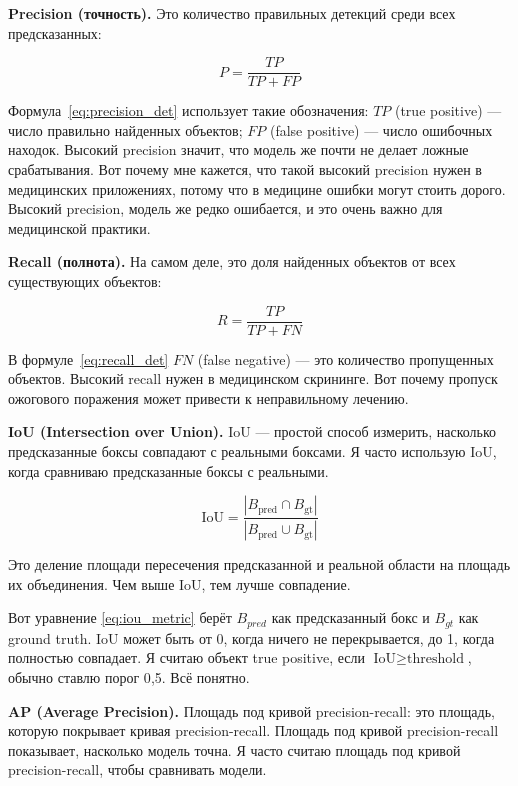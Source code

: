 \textbf{Precision (точность).} Это количество правильных детекций среди всех предсказанных:

\begin{equation}
P = \frac{TP}{TP + FP}
\label{eq:precision_det}
\end{equation}

Формула~\eqref{eq:precision_det} использует такие обозначения: $TP$ (true positive) --- число правильно найденных объектов; $FP$ (false positive) --- число ошибочных находок. Высокий precision значит, что модель же почти не делает ложные срабатывания. Вот почему мне кажется, что такой высокий precision нужен в медицинских приложениях, потому что в медицине ошибки могут стоить дорого. Высокий precision, модель же редко ошибается, и это очень важно для медицинской практики.

\textbf{Recall (полнота).} На самом деле, это доля найденных объектов от всех существующих объектов:

\begin{equation}
R = \frac{TP}{TP + FN}
\label{eq:recall_det}
\end{equation}

В формуле~\eqref{eq:recall_det} $FN$ (false negative) — это количество пропущенных объектов. Высокий recall нужен в медицинском скрининге. Вот почему пропуск ожогового поражения может привести к неправильному лечению.

\textbf{IoU (Intersection over Union).} IoU — простой способ измерить, насколько предсказанные боксы совпадают с реальными боксами. Я часто использую IoU, когда сравниваю предсказанные боксы с реальными.

\begin{equation}
\text{IoU} = \frac{|B_{\text{pred}} \cap B_{\text{gt}}|}{|B_{\text{pred}} \cup B_{\text{gt}}|}
\label{eq:iou_metric}
\end{equation}

Это деление площади пересечения предсказанной и реальной области на площадь их объединения. Чем выше IoU, тем лучше совпадение.

Вот уравнение \eqref{eq:iou_metric} берёт $B_{pred}$ как предсказанный бокс и $B_{gt}$ как ground truth. IoU может быть от 0, когда ничего не перекрывается, до 1, когда полностью совпадает. Я считаю объект true positive, если $\text{IoU} \geq \text{threshold}$, обычно ставлю порог 0{,}5. Всё понятно.

\textbf{AP (Average Precision).} Площадь под кривой precision-recall: это площадь, которую покрывает кривая precision-recall. Площадь под кривой precision-recall показывает, насколько модель точна. Я часто считаю площадь под кривой precision-recall, чтобы сравнивать модели.

